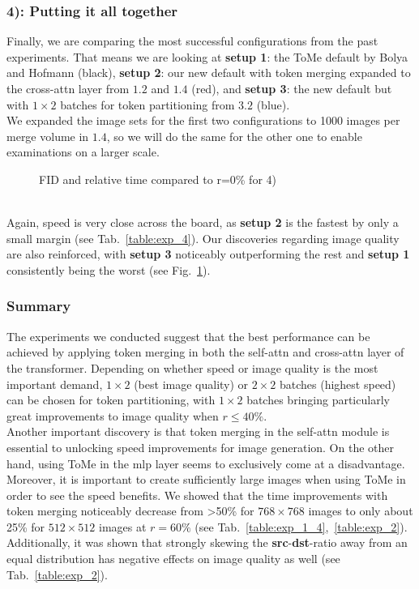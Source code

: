 \subsubsection*{4): Putting it all together}
Finally, we are comparing the most successful configurations from the past experiments. That means we are looking at \textbf{setup 1}: the ToMe default by Bolya and Hofmann (black), \textbf{setup 2}: our new default with token merging expanded to the cross-attn layer from \(1.2\) and \(1.4\) (red), and \textbf{setup 3}: the new default but with $1 \times 2$ batches for token partitioning from \(3.2\) (blue).\\
We expanded the image sets for the first two configurations to 1000 images per merge volume in \(1.4\), so we will do the same for the other one to enable examinations on a larger scale.
\begin{figure}[!htb]
    
    
\caption{FID and relative time compared to r=0\% for 4)}
\label{fig:exp_4}
\end{figure}\\
Again, speed is very close across the board, as \textbf{setup 2} is the fastest by only a small margin (see Tab.~\ref{table:exp_4}).
Our discoveries regarding image quality are also reinforced, with \textbf{setup 3} noticeably outperforming the rest and \textbf{setup 1} consistently being the worst (see Fig.~\ref{fig:exp_4}).\\



\subsubsection*{Summary}
The experiments we conducted suggest that the best performance can be achieved by applying token merging in both the self-attn and cross-attn layer of the transformer. Depending on whether speed or image quality is the most important demand, $1 \times 2$ (best image quality) or $2 \times 2$ batches (highest speed) can be chosen for token partitioning, with $1 \times 2$ batches bringing particularly great improvements to image quality when \(r\leq40\%\).\\
Another important discovery is that token merging in the self-attn module is essential to unlocking speed improvements for image generation. On the other hand, using ToMe in the mlp layer seems to exclusively come at a disadvantage.\\
Moreover, it is important to create sufficiently large images when using ToMe in order to see the speed benefits. We showed that the time improvements with token merging noticeably decrease from >50\% for $768 \times 768$ images to only about 25\% for $512 \times 512$ images at \(r=60\%\) (see Tab.~\ref{table:exp_1_4},~\ref{table:exp_2}).\\
Additionally, it was shown that strongly skewing the \textbf{src}-\textbf{dst}-ratio away from an equal distribution has negative effects on image quality as well (see Tab.~\ref{table:exp_2}).
